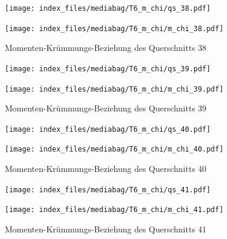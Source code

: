 \documentclass[
  11pt,
  letterpaper,
]{scrreprt}
\begin{document}
\begin{figure}[H]

\begin{minipage}{0.50\linewidth}
\texttt{[image: index\_files/mediabag/T6\_m\_chi/qs\_38.pdf]}\end{minipage}%
%
\begin{minipage}{0.50\linewidth}
\texttt{[image: index\_files/mediabag/T6\_m\_chi/m\_chi\_38.pdf]}\end{minipage}%

\caption{\label{fig-mchi_anhang}Momenten-Krümmungs-Beziehung des
Querschnitts 38}

\end{figure}%

\begin{figure}[H]

\begin{minipage}{0.50\linewidth}
\texttt{[image: index\_files/mediabag/T6\_m\_chi/qs\_39.pdf]}\end{minipage}%
%
\begin{minipage}{0.50\linewidth}
\texttt{[image: index\_files/mediabag/T6\_m\_chi/m\_chi\_39.pdf]}\end{minipage}%

\caption{\label{fig-mchi_anhang}Momenten-Krümmungs-Beziehung des
Querschnitts 39}

\end{figure}%

\begin{figure}[H]

\begin{minipage}{0.50\linewidth}
\texttt{[image: index\_files/mediabag/T6\_m\_chi/qs\_40.pdf]}\end{minipage}%
%
\begin{minipage}{0.50\linewidth}
\texttt{[image: index\_files/mediabag/T6\_m\_chi/m\_chi\_40.pdf]}\end{minipage}%

\caption{\label{fig-mchi_anhang}Momenten-Krümmungs-Beziehung des
Querschnitts 40}

\end{figure}%

\begin{figure}[H]

\begin{minipage}{0.50\linewidth}
\texttt{[image: index\_files/mediabag/T6\_m\_chi/qs\_41.pdf]}\end{minipage}%
%
\begin{minipage}{0.50\linewidth}
\texttt{[image: index\_files/mediabag/T6\_m\_chi/m\_chi\_41.pdf]}\end{minipage}%

\caption{\label{fig-mchi_anhang}Momenten-Krümmungs-Beziehung des
Querschnitts 41}

\end{figure}%
\end{document}
